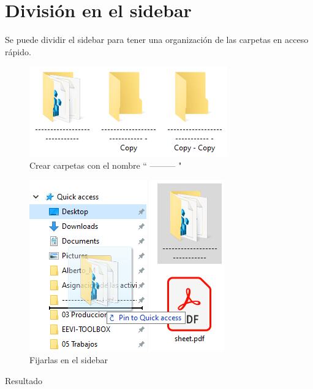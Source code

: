 \documentclass{report}
\begin{document}
\chapter{División en el sidebar}

Se puede dividir el sidebar para tener una organización de las carpetas en acceso rápido.

\begin{figure}[H]
	\centering
	\includegraphics[width=0.55\linewidth,height=0.45\textheight,keepaspectratio]{Imagenes/fe_division_01}
	\caption{Crear carpetas con el nombre `` --------- "}
	\label{fig:fedivision01}
\end{figure}

\begin{figure}[H]
	\centering
	\includegraphics[width=0.55\linewidth, height=0.45\textheight,keepaspectratio]{Imagenes/fe_division_02}
	\caption{Fijarlas en el sidebar}
	\label{fig:fedivision02}
\end{figure}

\clearpage

{\LARGE Resultado}
\end{document}
